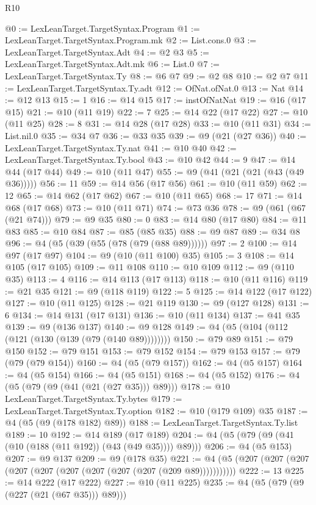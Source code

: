 \begin{lexlean}{R10}
\begin{coremodule}
{{{{{{{{{{{{{{{{{{{{{{{{{{{{{{{{{{{{{{{{{{{{{{{{{{{@0 := LexLeanTarget.TargetSyntax.Program
@1 := LexLeanTarget.TargetSyntax.Program.mk
@2 := List.cons.{0}
@3 := LexLeanTarget.TargetSyntax.Adt
@4 := @2 @3
@5 := LexLeanTarget.TargetSyntax.Adt.mk
@6 := List.{0}
@7 := LexLeanTarget.TargetSyntax.Ty
@8 := @6 @7
@9 := @2 @8
@10 := @2 @7
@11 := LexLeanTarget.TargetSyntax.Ty.adt
@12 := OfNat.ofNat.{0}
@13 := Nat
@14 := @12 @13
@15 := 1
@16 := @14 @15
@17 := instOfNatNat
@19 := @16 (@17 @15)
@21 := @10 (@11 @19)
@22 := 7
@25 := @14 @22 (@17 @22)
@27 := @10 (@11 @25)
@28 := 8
@31 := @14 @28 (@17 @28)
@33 := @10 (@11 @31)
@34 := List.nil.{0}
@35 := @34 @7
@36 := @33 @35
@39 := @9 (@21 (@27 @36))
@40 := LexLeanTarget.TargetSyntax.Ty.nat
@41 := @10 @40
@42 := LexLeanTarget.TargetSyntax.Ty.bool
@43 := @10 @42
@44 := 9
@47 := @14 @44 (@17 @44)
@49 := @10 (@11 @47)
@55 := @9 (@41 (@21 (@21 (@43 (@49 @36)))))
@56 := 11
@59 := @14 @56 (@17 @56)
@61 := @10 (@11 @59)
@62 := 12
@65 := @14 @62 (@17 @62)
@67 := @10 (@11 @65)
@68 := 17
@71 := @14 @68 (@17 @68)
@73 := @10 (@11 @71)
@74 := @73 @36
@78 := @9 (@61 (@67 (@21 @74)))
@79 := @9 @35
@80 := 0
@83 := @14 @80 (@17 @80)
@84 := @11 @83
@85 := @10 @84
@87 := @85 (@85 @35)
@88 := @9 @87
@89 := @34 @8
@96 := @4 (@5 (@39 (@55 (@78 (@79 (@88 @89))))))
@97 := 2
@100 := @14 @97 (@17 @97)
@104 := @9 (@10 (@11 @100) @35)
@105 := 3
@108 := @14 @105 (@17 @105)
@109 := @11 @108
@110 := @10 @109
@112 := @9 (@110 @35)
@113 := 4
@116 := @14 @113 (@17 @113)
@118 := @10 (@11 @116)
@119 := @21 @35
@121 := @9 (@118 @119)
@122 := 5
@125 := @14 @122 (@17 @122)
@127 := @10 (@11 @125)
@128 := @21 @119
@130 := @9 (@127 @128)
@131 := 6
@134 := @14 @131 (@17 @131)
@136 := @10 (@11 @134)
@137 := @41 @35
@139 := @9 (@136 @137)
@140 := @9 @128
@149 := @4 (@5 (@104 (@112 (@121 (@130 (@139 (@79 (@140 @89))))))))
@150 := @79 @89
@151 := @79 @150
@152 := @79 @151
@153 := @79 @152
@154 := @79 @153
@157 := @79 (@79 (@79 @154))
@160 := @4 (@5 (@79 @157))
@162 := @4 (@5 @157)
@164 := @4 (@5 @154)
@166 := @4 (@5 @151)
@168 := @4 (@5 @152)
@176 := @4 (@5 (@79 (@9 (@41 (@21 (@27 @35))) @89)))
@178 := @10 LexLeanTarget.TargetSyntax.Ty.bytes
@179 := LexLeanTarget.TargetSyntax.Ty.option
@182 := @10 (@179 @109) @35
@187 := @4 (@5 (@9 (@178 @182) @89))
@188 := LexLeanTarget.TargetSyntax.Ty.list
@189 := 10
@192 := @14 @189 (@17 @189)
@204 := @4 (@5 (@79 (@9 (@41 (@10 (@188 (@11 @192)) (@43 (@49 @35)))) @89)))
@206 := @4 (@5 @153)
@207 := @9 @137
@209 := @9 (@178 @35)
@221 := @4 (@5 (@207 (@207 (@207 (@207 (@207 (@207 (@207 (@207 (@207 (@209 @89)))))))))))
@222 := 13
@225 := @14 @222 (@17 @222)
@227 := @10 (@11 @225)
@235 := @4 (@5 (@79 (@9 (@227 (@21 (@67 @35))) @89)))
}}}}}}}}}}}}}}}}}}}}}}}}}}}}}}}}}}}}}}}}}}}}}}}}}}}
\end{coremodule}
\end{lexlean}
